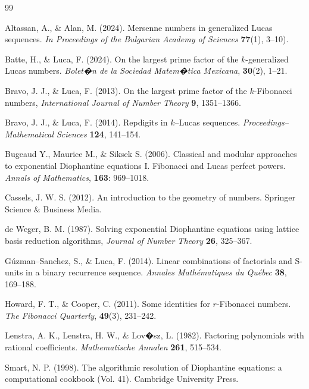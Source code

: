 \documentclass[11pt,a4paper]{article}
\numberwithin{equation}{section}
\numberwithin{table}{section}
\numberwithin{figure}{section}
\begin{document}
\begin{thebibliography}{99}
	
	Altassan, A., \& Alan, M. (2024). Mersenne numbers in generalized Lucas sequences. \textit{In Proceedings of the Bulgarian Academy of Sciences} \textbf{77}(1), 3--10).
	
	Batte, H., \& Luca, F. (2024). On the largest prime factor of the $k$-generalized Lucas numbers. \textit{Bolet�n de la Sociedad Matem�tica Mexicana}, \textbf{30}(2), 1--21.
	
	Bravo, J. J., \& Luca, F.  (2013). On the largest prime factor of the $k$-Fibonacci numbers, {\it International Journal of Number Theory\/} {\bf 9}, 1351--1366.
		
	Bravo, J. J., \& Luca, F. (2014). Repdigits in $k$--Lucas sequences. {\it Proceedings--Mathematical Sciences\/} {\bf 124}, 141--154.
    
    Bugeaud Y.,  Maurice M., \& Siksek S.  (2006). Classical and modular approaches to exponential Diophantine equations I. Fibonacci and Lucas perfect powers.  \textit{Annals of Mathematics}, {\bf 163}: 969--1018.
    
    Cassels, J. W. S. (2012). An introduction to the geometry of numbers. Springer Science \& Business Media.
    
    de Weger, B. M. (1987). Solving exponential Diophantine equations using lattice basis reduction algorithms, {\it Journal of Number Theory\/} {\bf 26},  325--367.
    
    G{\'u}zman--Sanchez, S., \& Luca, F. (2014). Linear combinations of factorials and S-units in a binary recurrence sequence. {\it Annales Math{\'e}matiques du Qu{\'e}bec\/} {\bf  38}, 169--188.	
	
	Howard, F. T., \& Cooper, C. (2011). Some identities for $r$-Fibonacci numbers. \textit{The Fibonacci Quarterly}, \textbf{49}(3), 231--242.
	
	Lenstra, A. K., Lenstra, H. W., \& Lov�sz, L. (1982). Factoring polynomials with rational coefficients. {\it Mathematische Annalen\/} {\bf 261}, 515--534.
	
	Smart, N. P. (1998). The algorithmic resolution of Diophantine equations: a computational cookbook (Vol. 41). Cambridge University Press.
	
		
\end{thebibliography}
\end{document}
